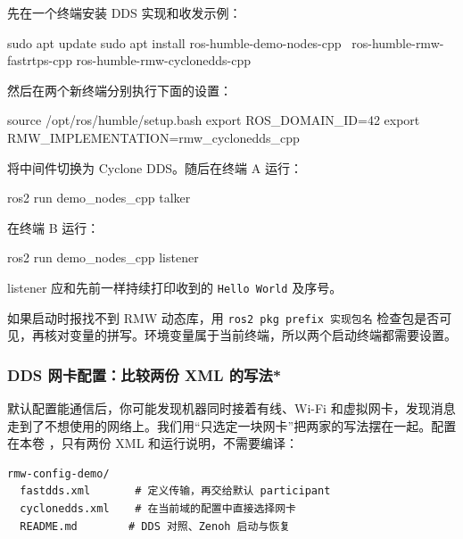 \begin{example}
先在一个终端安装 DDS 实现和收发示例：
\par\medskip\noindent\begin{minipage}{\linewidth}
\begin{tbash}
sudo apt update
sudo apt install ros-humble-demo-nodes-cpp \
  ros-humble-rmw-fastrtps-cpp ros-humble-rmw-cyclonedds-cpp
\end{tbash}
\end{minipage}\par\smallskip
然后在两个新终端分别执行下面的设置：
\par\medskip\noindent\begin{minipage}{\linewidth}
\begin{tbash}
source /opt/ros/humble/setup.bash
export ROS_DOMAIN_ID=42
export RMW_IMPLEMENTATION=rmw_cyclonedds_cpp
\end{tbash}
\end{minipage}\par\smallskip
将中间件切换为 Cyclone DDS。随后在终端 A 运行：
\par\medskip\noindent\begin{minipage}{\linewidth}
\begin{tbash}
ros2 run demo_nodes_cpp talker
\end{tbash}
\end{minipage}\par\smallskip
在终端 B 运行：
\par\medskip\noindent\begin{minipage}{\linewidth}
\begin{tbash}
ros2 run demo_nodes_cpp listener
\end{tbash}
\end{minipage}\par\smallskip
listener 应和先前一样持续打印收到的 \texttt{Hello World} 及序号。
\end{example}

如果启动时报找不到 RMW 动态库，用 \texttt{ros2 pkg prefix 实现包名} 检查包是否可见，再核对变量的拼写。环境变量属于当前终端，所以两个启动终端都需要设置。

\subsubsection{DDS 网卡配置：比较两份 XML 的写法*}
默认配置能通信后，你可能发现机器同时接着有线、Wi-Fi 和虚拟网卡，发现消息走到了不想使用的网络上。我们用“只选定一块网卡”把两家的写法摆在一起。配置在本卷 ，只有两份 XML 和运行说明，不需要编译：
\par\medskip\noindent\begin{minipage}{\linewidth}
\begin{lstlisting}[language={}]
rmw-config-demo/
  fastdds.xml       # 定义传输，再交给默认 participant
  cyclonedds.xml    # 在当前域的配置中直接选择网卡
  README.md        # DDS 对照、Zenoh 启动与恢复
\end{lstlisting}
\end{minipage}\par\smallskip

